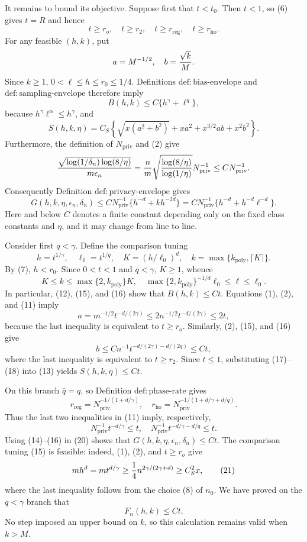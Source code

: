 It remains to bound its objective.  Suppose first that \(t<t_0\).  Then \(t<1\), so (6) gives \(t=R\) and hence
\[
 t\ge r_o,\quad t\ge r_2,
 \quad t\ge r_{\mathrm{reg}},\quad t\ge r_{\mathrm{ho}}.
\tag{11}
\]
For any feasible \((h,k)\), put
\[
 a=M^{-1/2},\quad b={\sqrt{k}\over M}.
\]
Since \(k\ge1\), \(0<\ell\le h\le r_0\le1/4\).  Definitions \(\mathrm{def{:}bias\text{-}envelope}\) and \(\mathrm{def{:}sampling\text{-}envelope}\) therefore imply
\[
 B(h,k)\le C\{h^\gamma+\ell^q\},
\tag{12}
\]
because \(h^\gamma\ell^\alpha\le h^\gamma\), and
\[
 S(h,k,\eta)=C_S\left\{
 \sqrt{x(a^2+b^2)}+xa^2+x^{3/2}ab+x^2b^2
 \right\}.
\tag{13}
\]
Furthermore, the definition of \(N_{\mathrm{priv}}\) and (2) give
\[
 {\sqrt{\log(1/\delta_n)\log(8/\eta)}\over m\epsilon_n}
 ={n\over m}\sqrt{{\log(8/\eta)\over\log(1/\eta)}}
 N_{\mathrm{priv}}^{-1}
 \le C N_{\mathrm{priv}}^{-1}.
\]
Consequently Definition \(\mathrm{def{:}privacy\text{-}envelope}\) gives
\[
 G(h,k,\eta,\epsilon_n,\delta_n)
 \le C N_{\mathrm{priv}}^{-1}\{h^{-d}+kh^{-2d}\}
 =C N_{\mathrm{priv}}^{-1}\{h^{-d}+h^{-d}\ell^{-d}\}.
\tag{14}
\]
Here and below \(C\) denotes a finite constant depending only on the fixed class constants and \(\eta\), and it may change from line to line.

Consider first \(q<\gamma\).  Define the comparison tuning
\[
 h=t^{1/\gamma},\quad \ell_0=t^{1/q},
 \quad K=(h/\ell_0)^d,\quad
 k=\max\{k_{\mathrm{poly}},\lceil K\rceil\}.
\tag{15}
\]
By (7), \(h<r_0\).  Since \(0<t<1\) and \(q<\gamma\), \(K\ge1\), whence
\[
 K\le k\le \max\{2,k_{\mathrm{poly}}\}K,
 \quad
 \max\{2,k_{\mathrm{poly}}\}^{-1/d}\ell_0
 \le \ell\le\ell_0.
\tag{16}
\]
In particular, (12), (15), and (16) show that \(B(h,k)\le Ct\).  Equations (1), (2), and (11) imply
\[
 a=m^{-1/2}t^{-d/(2\gamma)}
 \le2n^{-1/2}t^{-d/(2\gamma)}
 \le2t,
\tag{17}
\]
because the last inequality is equivalent to \(t\ge r_o\).  Similarly, (2), (15), and (16) give
\[
 b\le Cn^{-1}t^{-d/(2\gamma)-d/(2q)}\le Ct,
\tag{18}
\]
where the last inequality is equivalent to \(t\ge r_2\).  Since \(t\le1\), substituting (17)--(18) into (13) yields \(S(h,k,\eta)\le Ct\).

On this branch \(\bar q=q\), so Definition \(\mathrm{def{:}phase\text{-}rate}\) gives
\[
 r_{\mathrm{reg}}=N_{\mathrm{priv}}^{-1/(1+d/\gamma)},
 \quad
 r_{\mathrm{ho}}=N_{\mathrm{priv}}^{-1/(1+d/\gamma+d/q)}.
\tag{19}
\]
Thus the last two inequalities in (11) imply, respectively,
\[
 N_{\mathrm{priv}}^{-1}t^{-d/\gamma}\le t,
 \quad
 N_{\mathrm{priv}}^{-1}t^{-d/\gamma-d/q}\le t.
\tag{20}
\]
Using (14)--(16) in (20) shows that \(G(h,k,\eta,\epsilon_n,\delta_n)\le Ct\).  The comparison tuning (15) is feasible: indeed, (1), (2), and \(t\ge r_o\) give
\[
 mh^d=mt^{d/\gamma}
 \ge {1\over4}n^{2\gamma/(2\gamma+d)}
 \ge C_S^2x,
\tag{21}
\]
where the last inequality follows from the choice (8) of \(n_0\).  We have proved on the \(q<\gamma\) branch that
\[
 F_n(h,k)\le Ct.
\tag{22}
\]
No step imposed an upper bound on \(k\), so this calculation remains valid when \(k>M\).

